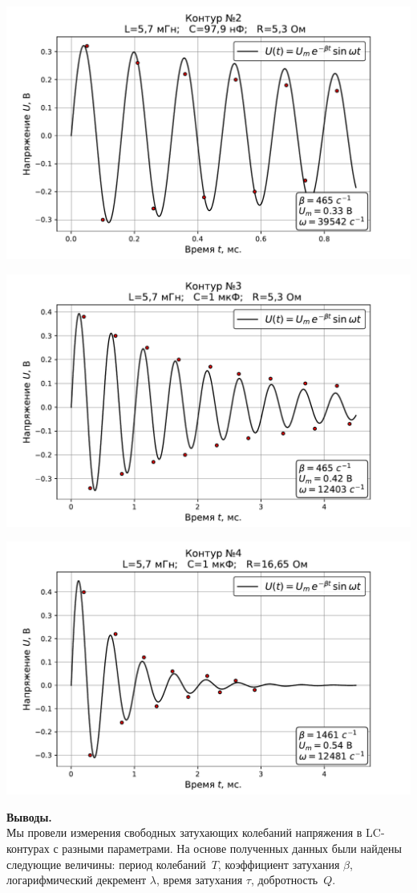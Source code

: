 \documentclass[ a4paper]{article}
\begin{document}
\begin{center}
	\includegraphics[scale=0.65]{2.pdf}
\end{center}

\begin{center}
	\includegraphics[scale=0.65]{3.pdf}
\end{center}

\begin{center}
	\includegraphics[scale=0.65]{4.pdf}
\end{center}
{\parindent=0pt\textbf{Выводы.}}\\
Мы провели измерения свободных затухающих колебаний напряжения в LC-контурах с разными параметрами. 
На основе полученных данных были найдены следующие величины: период колебаний~$T$, коэффициент затухания $\beta$, 
логарифмический декремент $\lambda$, время затухания $\tau$, добротность~$Q$.
\end{document}
